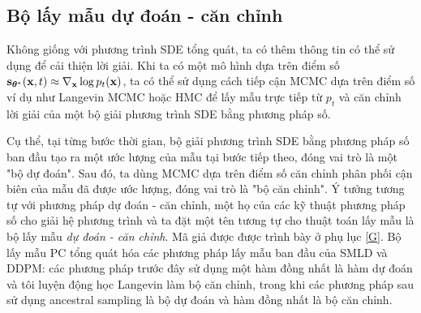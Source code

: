 \documentclass{article} %
\begin{document}
\subsection{Bộ lấy mẫu dự đoán - căn chỉnh}

Không giống với phương trình SDE tổng quát, ta có thêm thông tin có thể sử dụng để cải thiện lời giải.
Khi ta có một mô hình dựa trên điểm số $\bold{s}_{\boldsymbol{\theta}^{\ast}} (\bold{x}, t)\approx \nabla_{\bold{x}} \log p_t (\bold{x})$, ta có thể sử dụng cách tiếp cận MCMC dựa trên điểm số ví dụ như Langevin MCMC \citep{parisi1981correlation,grenander1994representations} hoặc HMC \citep{neal2011mcmc} để lấy mẫu trực tiếp từ $p_t$ và căn chỉnh lời giải của một bộ giải phương trình SDE bằng phương pháp số.

Cụ thể, tại từng bước thời gian, bộ giải phương trình SDE bằng phương pháp số ban đầu tạo ra một ước lượng của mẫu tại bước tiếp theo, đóng vai trò là một "bộ dự đoán".
Sau đó, ta dùng MCMC dựa trên điểm số căn chỉnh phân phối cận biên của mẫu đã được ước lượng, đóng vai trò là "bộ căn chỉnh".
Ý tưởng tương tự với phương pháp dự đoán - căn chỉnh, một họ của các kỹ thuật phương pháp số cho giải hệ phương trình \citep{allgower2012numerical} và ta đặt một tên tương tự cho thuật toán lấy mẫu là bộ lấy mẫu \textit{dự đoán - căn chỉnh}.
Mã giả được được trình bày ở phụ lục \ref{G}.
Bộ lấy mẫu PC tổng quát hóa các phương pháp lấy mẫu ban đầu của SMLD và DDPM: các phương pháp trước đây sử dụng một hàm đồng nhất là hàm dự đoán và tôi luyện động học Langevin làm bộ căn chỉnh, trong khi các phương pháp sau sử dụng ancestral sampling là bộ dự đoán và hàm đồng nhất là bộ căn chỉnh.
\end{document}
